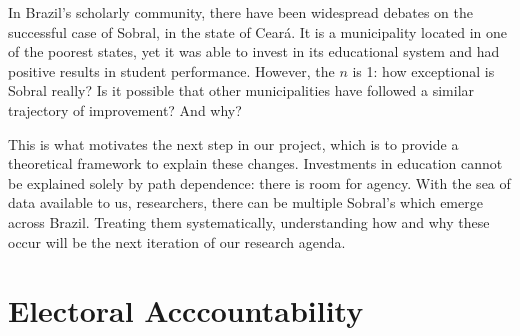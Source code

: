 \documentclass[12pt,]{book}
\begin{document}
In Brazil's scholarly community, there have been widespread debates on the successful case of Sobral, in the state of Ceará. It is a municipality located in one of the poorest states, yet it was able to invest in its educational system and had positive results in student performance. However, the \(n\) is 1: how exceptional is Sobral really? Is it possible that other municipalities have followed a similar trajectory of improvement? And why?

This is what motivates the next step in our project, which is to provide a theoretical framework to explain these changes. Investments in education cannot be explained solely by path dependence: there is room for agency. With the sea of data available to us, researchers, there can be multiple Sobral's which emerge across Brazil. Treating them systematically, understanding how and why these occur will be the next iteration of our research agenda.

\hypertarget{electoral-acccountability}{%
\chapter{Electoral Acccountability}\label{electoral-acccountability}}
\end{document}
